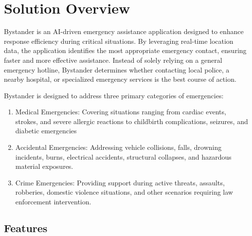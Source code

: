 \section{Solution Overview}
\label{section:solution-overview}

Bystander is an AI-driven emergency assistance application designed to enhance response efficiency during critical situations. By leveraging real-time location data, the application identifies the most appropriate emergency contact, ensuring faster and more effective assistance. Instead of solely relying on a general emergency hotline, Bystander determines whether contacting local police, a nearby hospital, or specialized emergency services is the best course of action.

Bystander is designed to address three primary categories of emergencies:

\begin{enumerate}
    \item Medical Emergencies: Covering situations ranging from cardiac events, strokes, and severe allergic reactions to childbirth complications, seizures, and diabetic emergencies
    \item Accidental Emergencies: Addressing vehicle collisions, falls, drowning incidents, burns, electrical accidents, structural collapses, and hazardous material exposures.
    \item Crime Emergencies: Providing support during active threats, assaults, robberies, domestic violence situations, and other scenarios requiring law enforcement intervention.
\end{enumerate}

\subsection{Features}
\label{subsection:features}

